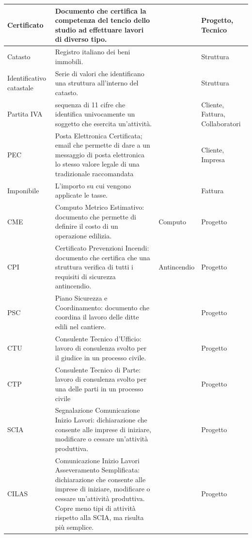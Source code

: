 \documentclass{elegantbook}
\begin{document}
\begin{center}
\begin{longtable}{|l|p{7cm}|l|p{3cm}|}
			Certificato & Documento che certifica la competenza del tencio dello studio ad effettuare lavori di diverso tipo. & & Progetto, Tecnico \\
			\hline
			
			Catasto & Registro italiano dei beni immobili. & & Struttura\\
			\hline
			
			Identificativo catastale& Serie di valori che identificano una struttura all'interno del catasto. & & Struttura\\
			\hline
			
			Partita IVA & sequenza di 11 cifre che identifica univocamente un soggetto che esercita un'attività. & & Cliente, Fattura, Collaboratori\\
			\hline
			
			PEC & Posta Elettronica Certificata; email che permette di dare a un messaggio di posta elettronica lo stesso valore legale di una tradizionale raccomandata&&Cliente, Impresa\\
			\hline 
			
			Imponibile& L'importo su cui vengono applicate le tasse.&&Fattura\\
			\hline
			
			CME & Computo Metrico Estimativo: documento che permette di definire il costo di un operazione edilizia. & Computo &Progetto\\
			\hline
			
			CPI & Certificato Prevenzioni Incendi: documento che certifica che una struttura verifica di tutti i requisiti di sicurezza antincendio. & Antincendio & Progetto\\
			\hline
			
			PSC & Piano Sicurezza e Coordinamento: documento che coordina il lavoro delle ditte edili nel cantiere. & & Progetto\\
			\hline
			
			CTU & Consulente Tecnico d'Ufficio: lavoro di consulenza svolto per il giudice in un processo civile. & & Progetto\\
			\hline
			
			CTP & Consulente Tecnico di Parte: lavoro di consulenza svolto per una delle parti in un processo civile & & Progetto\\
			\hline
			
			SCIA & Segnalazione Comunicazione Inizio Lavori: dichiarazione che consente alle imprese di iniziare, modificare o cessare un’attività produttiva.  &  & Progetto\\
			\hline
			
			CILAS & Comunicazione Inizio Lavori Asseveramento Semplificata: dichiarazione che consente alle imprese di iniziare, modificare o cessare un’attività produttiva. Copre meno tipi di attività rispetto alla SCIA, ma risulta più semplice.& & Progetto \\
			\hline
		\end{longtable}
	\end{center}
	
\end{document}
